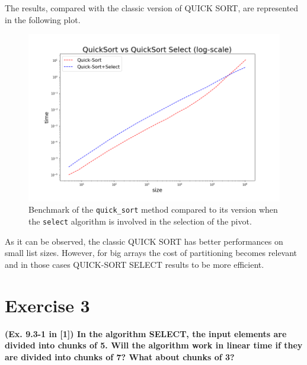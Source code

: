\documentclass{article}
\begin{document}
	\newpage
	
	\noindent The results, compared with the classic version of QUICK SORT, are represented in the following plot.
	
	\begin{figure}[h]
		\centering
		\includegraphics[width=1.1\textwidth]{quicksort.png}  
		\caption{Benchmark of the \texttt{quick\_sort} method compared to its version when the \texttt{select} algorithm is involved in the selection of the pivot.}
		\label{plot}
	\end{figure}
	
	\noindent As it can be observed, the classic QUICK SORT has better performances on small list sizes. However, for big arrays the cost of partitioning becomes relevant and in those cases QUICK-SORT SELECT results to be more efficient.
	
	
	\section*{Exercise 3}
	\textbf{(Ex. 9.3-1 in [1]) In the algorithm SELECT, the input elements are divided into chunks of 5. Will the algorithm work in linear time if they are divided into chunks of 7? What about chunks of 3?} \\
	
\end{document}
